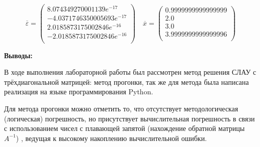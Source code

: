 \documentclass [12pt]{article}
\begin{document}
$$
\overline{\varepsilon} = 
\left(\begin{array}{c} 
8.074349270001139e^{-17}\\
-4.0371746350005693e^{-17}\\
2.0185873175002846e^{-16} \\
-2.0185873175002846e^{-16} \\
\end{array}\right)
\quad
\overline{x} =
 \left(\begin{array}{c} 
0.9999999999999999 \\
2.0 \\
3.0 \\
3.9999999999999996 \\
\end{array}\right)
$$


\textbf{Выводы:}

В ходе выполнения лабораторной работы был рассмотрен метод решения СЛАУ с трёхдиагональной матрицей: метод прогонки, так же для метода была написана реализация на языке программирования Python.

Для метода прогонки можно отметить то, что отсутствует методологическая (логическая) погрешность, но присутствует вычислительная погрешность в связи с использованием чисел с плавающей запятой (нахождение обратной матрицы $A^{-1}$) , ведущая к высокому накоплению вычислительной ошибки.
\end{document}
